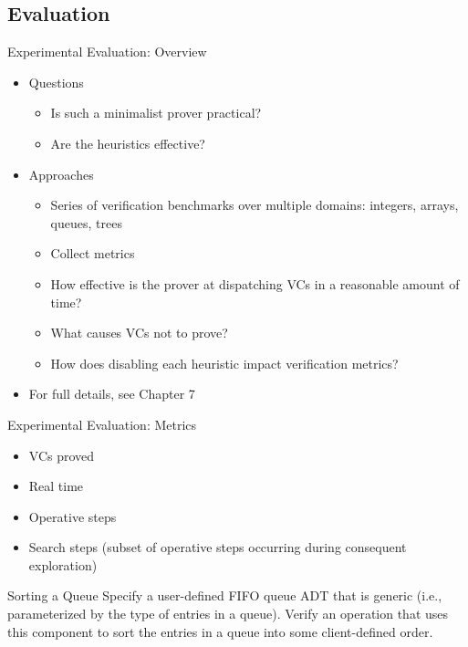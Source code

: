 \subsection{Evaluation}
\begin{frame}{Experimental Evaluation: Overview}
	\begin{itemize}
		\item Questions\\
		\begin{itemize}
			\item Is such a minimalist prover practical?
			\item Are the heuristics effective?
		\end{itemize}
		\item Approaches\\
		\begin{itemize}
			\item Series of verification benchmarks over multiple domains: integers, arrays, queues, trees
			\item Collect metrics
			\item How effective is the prover at dispatching VCs in a reasonable amount of time?
			\item What causes VCs not to prove?
			\item How does disabling each heuristic impact verification metrics?
		\end{itemize}
		\item For full details, see Chapter 7
	\end{itemize}
\end{frame}


\begin{frame}{Experimental Evaluation: Metrics}
	\begin{itemize}
		\item VCs proved
		\item Real time
		\item Operative steps
		\item Search steps (subset of operative steps occurring during consequent exploration)
	\end{itemize}
\end{frame}


\begin{frame}{Sorting a Queue}
	Specify a user-defined FIFO queue ADT that is generic (i.e., parameterized by the type of entries in a queue). Verify an operation that uses this component to sort the entries in a queue into some client-defined order.
	\vspace{2em}
	
\end{frame}


